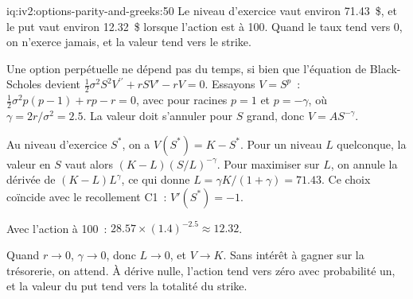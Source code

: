 \begin{solution}{iq:iv2:options-parity-and-greeks:50}
Le niveau d'exercice vaut environ 71.43~\$, et le put vaut environ 12.32~\$ lorsque l'action est à 100. Quand le taux tend vers 0, on n'exerce jamais, et la valeur tend vers le strike.

Une option perpétuelle ne dépend pas du temps, si bien que l'équation de Black-Scholes devient $\tfrac12\sigma^2S^2V^{\prime\prime} + rSV' - rV = 0$. Essayons $V = S^p$~: $\tfrac12\sigma^2p(p - 1) + rp - r = 0$, avec pour racines $p = 1$ et $p = -\gamma$, où $\gamma = 2r/\sigma^2 = 2.5$. La valeur doit s'annuler pour $S$ grand, donc $V = AS^{-\gamma}$.

Au niveau d'exercice $S^*$, on a $V(S^*) = K - S^*$. Pour un niveau $L$ quelconque, la valeur en $S$ vaut alors $(K - L)(S/L)^{-\gamma}$. Pour maximiser sur $L$, on annule la dérivée de $(K - L)L^\gamma$, ce qui donne $L = \gamma K/(1 + \gamma) = 71.43$. Ce choix coïncide avec le recollement C1~: $V'(S^*) = -1$.

Avec l'action à 100~: $28.57 \times (1.4)^{-2.5} \approx 12.32$.

Quand $r \to 0$, $\gamma \to 0$, donc $L \to 0$, et $V \to K$. Sans intérêt à gagner sur la trésorerie, on attend. À dérive nulle, l'action tend vers zéro avec probabilité un, et la valeur du put tend vers la totalité du strike.

\end{solution}
